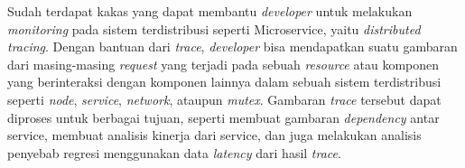 Sudah terdapat kakas yang dapat membantu \textit{developer} untuk  melakukan \textit{monitoring} pada sistem terdistribusi seperti Microservice, yaitu \textit{distributed tracing}. Dengan bantuan dari \textit{trace}, \textit{developer} bisa mendapatkan suatu gambaran dari masing-masing \textit{request} yang terjadi pada sebuah \textit{resource} atau komponen yang berinteraksi dengan komponen lainnya dalam sebuah sistem terdistribusi seperti \textit{node}, \textit{service}, \textit{network}, ataupun \textit{mutex}. Gambaran \textit{trace} tersebut dapat diproses untuk berbagai tujuan, seperti membuat gambaran \textit{dependency} antar service, membuat analisis kinerja dari service, dan juga melakukan analisis penyebab regresi menggunakan data \textit{latency} dari hasil \textit{trace}.
  

